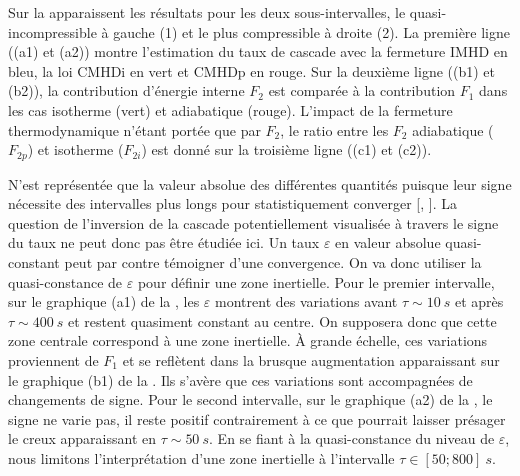 Sur la  apparaissent les résultats pour les deux sous-intervalles, le quasi-incompressible à gauche (1) et le plus compressible à droite (2). La première ligne ((a1) et (a2)) montre l'estimation du taux de cascade avec la fermeture IMHD en bleu, la loi CMHDi en vert et CMHDp en rouge. Sur la deuxième ligne ((b1) et (b2)), la contribution d'énergie interne $F_2$ est comparée à la contribution $F_1$ dans les cas isotherme (vert) et adiabatique (rouge). L'impact de la fermeture thermodynamique n'étant portée que par $F_2$, le ratio entre les $F_2$ adiabatique ($F_{2p}$) et isotherme ($F_{2i}$) est donné sur la troisième ligne ((c1) et (c2)).

N'est représentée que la valeur absolue des différentes quantités puisque leur signe nécessite des intervalles plus longs pour statistiquement converger [\cite{coburn_third-moment_2015}, \cite{hadid_energy_2017}]. La question de l'inversion de la cascade potentiellement visualisée à travers le signe du taux ne peut donc pas être étudiée ici. Un taux $\varepsilon$ en valeur absolue quasi-constant peut par contre témoigner d'une convergence. On va donc utiliser la quasi-constance de $\varepsilon$ pour définir une zone inertielle. Pour le premier intervalle, sur le graphique (a1) de la , les $\varepsilon$ montrent des variations avant $\tau \sim \SI{10}{s}$ et après  $\tau \sim \SI{400}{s}$ et restent quasiment constant au centre. On supposera donc que cette zone centrale correspond à une zone inertielle. À grande échelle, ces variations proviennent de $F_1$ et se reflètent dans la brusque augmentation apparaissant sur le graphique (b1) de la . Ils s'avère que ces variations sont accompagnées de changements de signe. Pour le second intervalle, sur le graphique (a2) de la , le signe ne varie pas, il reste positif contrairement à ce que pourrait laisser présager le creux apparaissant en $\tau \sim \SI{50}{s}$. En se fiant à la quasi-constance du niveau de $\varepsilon$, nous limitons l'interprétation d'une zone inertielle à l'intervalle $\tau \in [50;800]\SI{}{s}$. 

